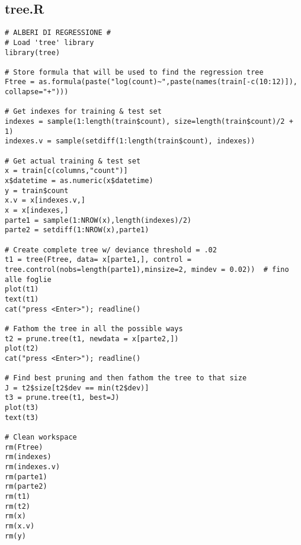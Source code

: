 \subsection{tree.R}\label{sec:tree-script}
\begin{verbatim}
# ALBERI DI REGRESSIONE #
# Load 'tree' library
library(tree)

# Store formula that will be used to find the regression tree
Ftree = as.formula(paste("log(count)~",paste(names(train[-c(10:12)]), collapse="+")))

# Get indexes for training & test set
indexes = sample(1:length(train$count), size=length(train$count)/2 + 1)
indexes.v = sample(setdiff(1:length(train$count), indexes))

# Get actual training & test set
x = train[c(columns,"count")]
x$datetime = as.numeric(x$datetime)
y = train$count
x.v = x[indexes.v,]
x = x[indexes,]
parte1 = sample(1:NROW(x),length(indexes)/2)
parte2 = setdiff(1:NROW(x),parte1)

# Create complete tree w/ deviance threshold = .02
t1 = tree(Ftree, data= x[parte1,], control = tree.control(nobs=length(parte1),minsize=2, mindev = 0.02))  # fino alle foglie
plot(t1)
text(t1)
cat("press <Enter>"); readline()

# Fathom the tree in all the possible ways
t2 = prune.tree(t1, newdata = x[parte2,])
plot(t2)
cat("press <Enter>"); readline()

# Find best pruning and then fathom the tree to that size
J = t2$size[t2$dev == min(t2$dev)]
t3 = prune.tree(t1, best=J)
plot(t3)
text(t3)

# Clean workspace
rm(Ftree)
rm(indexes)
rm(indexes.v)
rm(parte1)
rm(parte2)
rm(t1)
rm(t2)
rm(x)
rm(x.v)
rm(y)
\end{verbatim}
